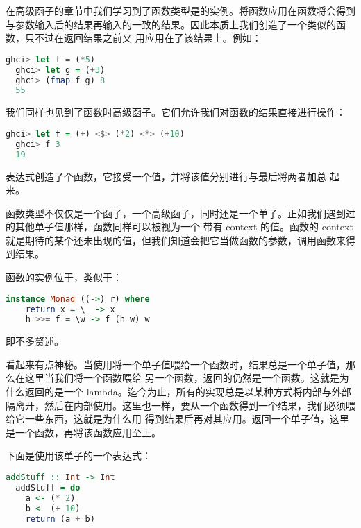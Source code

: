 \documentclass[./main.tex]{subfiles}
\begin{document}
在高级函子的章节中我们学习到了函数类型是的实例。将函数应用在函数将会得到
与参数输入后的结果再输入的一致的结果。因此本质上我们创造了一个类似的函数，只不过在返回结果之前又
用应用在了该结果上。例如：

\begin{lstlisting}[language=Haskell]
  ghci> let f = (*5)
  ghci> let g = (+3)
  ghci> (fmap f g) 8
  55
\end{lstlisting}

我们同样也见到了函数时高级函子。它们允许我们对函数的结果直接进行操作：

\begin{lstlisting}[language=Haskell]
  ghci> let f = (+) <$> (*2) <*> (+10)
  ghci> f 3
  19
\end{lstlisting}

表达式创造了个函数，它接受一个值，并将该值分别进行与最后将两者加总
起来。

函数类型不仅仅是一个函子，一个高级函子，同时还是一个单子。正如我们遇到过的其他单子值那样，函数同样可以被视为一个
带有 context 的值。函数的 context 就是期待的某个还未出现的值，但我们知道会把它当做函数的参数，调用函数来得到结果。

函数的实例位于，类似于：

\begin{lstlisting}[language=Haskell]
  instance Monad ((->) r) where
    return x = \_ -> x
    h >>= f = \w -> f (h w) w
\end{lstlisting}

即不多赘述。

\acode{>>=}看起来有点神秘。当使用\acode{>>=}将一个单子值喂给一个函数时，结果总是一个单子值，那么在这里当我们将一个函数喂给
另一个函数，返回的仍然是一个函数。这就是为什么返回的是一个 lambda。迄今为止，所有的\acode{>>=}实现总是以某种方式将内部与外部
隔离开，然后在内部使用。这里也一样，要从一个函数得到一个结果，我们必须喂给它一些东西，这就是为什么用
得到结果后再对其应用。返回一个单子值，这里是一个函数，再将该函数应用至上。

下面是使用该单子的一个表达式：

\begin{lstlisting}[language=Haskell]
  addStuff :: Int -> Int
  addStuff = do
    a <- (* 2)
    b <- (+ 10)
    return (a + b)
\end{lstlisting}
\end{document}
